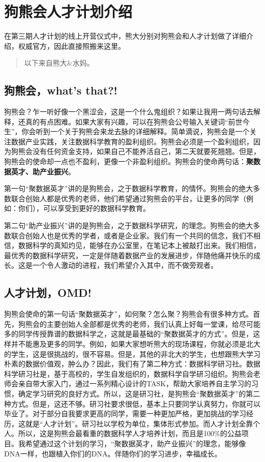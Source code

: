 \documentclass[]{ctexbook}
\begin{document}
\mainmatter

\chapter{狗熊会人才计划介绍}\label{intro}

在第三期人才计划的线上开营仪式中，熊大分别对狗熊会和人才计划做了详细介绍，权威官方，因此直接照搬来这里。

\begin{quote}
以下来自熊大\&水妈。
\end{quote}

\section{狗熊会，what's that?!}\label{whats-that}

狗熊会？乍一听好像一个黑涩会，这是一个什么鬼组织？如果让我用一两句话去解释，还真的有点困难。如果大家有兴趣，可以在狗熊会公号输入关键词``前世今生''，你会听到一个关于狗熊会来龙去脉的详细解释。简单滴说，狗熊会是一个关注数据产业实践，关注数据科学教育的盈利组织。狗熊会必须是一个盈利组织，因为狗熊会没有任何资金支持，如果自己不能养活自己，第二天就要死翘翘。但是，狗熊会的使命却一点也不盈利，更像一个非盈利组织。狗熊会的使命两句话：\textbf{聚数据英才、助产业振兴}。

第一句``聚数据英才''讲的是狗熊会，之于数据科学教育，的情怀。狗熊会的绝大多数联合创始人都是优秀的老师，他们希望通过狗熊会的平台，让更多的同学（例如：你们），可以享受到更好的数据科学教育。

第二句``助产业振兴''讲的是狗熊会，之于数据科学研究，的理念。狗熊会的绝大多数联合创始人也是优秀的学者，或者是企业家。我们有一个共同的信念，我们不相信，数据科学的真知灼见，能够在办公室里，在笔记本上被敲打出来。我们相信，最优秀的数据科学研究，一定是伴随着数据产业的发展进步，伴随他痛并快乐的成长。这是一个令人激动的进程，我们希望介入其中，而不做旁观者。

\section{人才计划，OMD!}\label{omd}

狗熊会使命的第一句话``聚数据英才''，如何聚？怎么聚？狗熊会有很多种方式。首先，狗熊会的主要创始人全部都是优秀的老师，我们认真上好每一堂课，给尽可能多的同学传授靠谱的数据科学之，这就是最基础的``聚数据英才的方式''。但是，这样并不能惠及更多的同学。例如，如果大家想听熊大的现场课程，你就必须是北大的学生，这是很挑战的，很不容易。但是，其他的非北大的学生，也想跟熊大学习朴素的数据价值观，肿么办？因此，我们有了第二种方式：数据科学研习社。数据科学研习社是，基于高校的，学生自发组织的，数据科学自学研习组织。狗熊会老师会亲自带大家入门，通过一系列精心设计的TASK，帮助大家培养自主学习的习惯，确定学习研究的良好方式。所以，这是研习社，是狗熊会``聚数据英才''的第二种方式。但是，这还不够。研习社要求很低，基本上只要同学认真努力，你就可以毕业了。对于部分自我要求更高的同学，需要一种更加严格，更加挑战的学习经历，这就是``人才计划''。研习社以学校为单位，集体形式参加。而人才计划全靠个人。所以，这是狗熊会最看重的数据科学人才培养计划，而且是100\%的公益项目。我希望通过这个计划的学习，``聚数据英才，助产业振兴''的理念，能够像DNA一样，也跟植入你们的DNA。伴随你们的学习进步，幸福成长。
\end{document}
